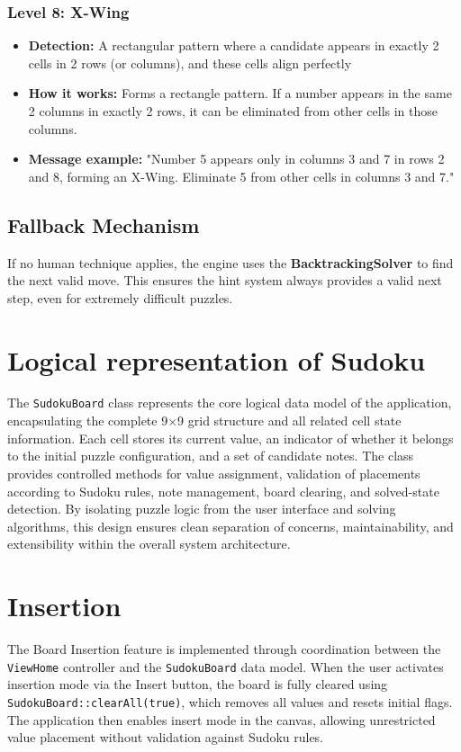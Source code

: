 \documentclass[12pt,a4paper]{article}
\begin{document}
\subsubsection*{Level 8: X-Wing}
\begin{itemize}
    \item \textbf{Detection:} A rectangular pattern where a candidate appears in exactly 2 cells in 2 rows (or columns), and these cells align perfectly
    \item \textbf{How it works:} Forms a rectangle pattern. If a number appears in the same 2 columns in exactly 2 rows, it can be eliminated from other cells in those columns.
    \item \textbf{Message example:} "Number 5 appears only in columns 3 and 7 in rows 2 and 8, forming an X-Wing. Eliminate 5 from other cells in columns 3 and 7."
\end{itemize}

\subsection{Fallback Mechanism}
If no human technique applies, the engine uses the \textbf{BacktrackingSolver} to find the next valid move. This ensures the hint system always provides a valid next step, even for extremely difficult puzzles.

\section{Logical representation of Sudoku}
The \texttt{SudokuBoard} class represents the core logical data model of the application, encapsulating the complete 9$\times$9 grid structure and all related cell state information. Each cell stores its current value, an indicator of whether it belongs to the initial puzzle configuration, and a set of candidate notes. The class provides controlled methods for value assignment, validation of placements according to Sudoku rules, note management, board clearing, and solved-state detection. By isolating puzzle logic from the user interface and solving algorithms, this design ensures clean separation of concerns, maintainability, and extensibility within the overall system architecture.

\section{Insertion}
The Board Insertion feature is implemented through coordination between the \texttt{ViewHome} controller and the \texttt{SudokuBoard} data model. When the user activates insertion mode via the Insert button, the board is fully cleared using \texttt{SudokuBoard::clearAll(true)}, which removes all values and resets initial flags. The application then enables insert mode in the canvas, allowing unrestricted value placement without validation against Sudoku rules.
\end{document}
